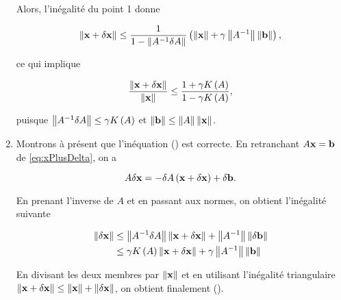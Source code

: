 \begin{enumerate}[label=\alph*)]
  Alors, l'inégalité du point 1 donne 
  
  \begin{equation*}
    \left\lVert\mathbf{x} + \delta \mathbf{x}\right\rVert
    \leq \dfrac{1}{1 - \left\lVert A^{-1} \delta A\right\rVert} \left(\left\lVert\mathbf{x}\right\rVert + \gamma \left\lVert A^{-1}\right\rVert \left\lVert\mathbf{b}\right\rVert\right),
  \end{equation*}
  
  ce qui implique
  
  \begin{equation*}
    \dfrac{\left\lVert\mathbf{x} + \delta \mathbf{x}\right\rVert}{\left\lVert\mathbf{x}\right\rVert}
    \leq \dfrac{1 + \gamma K \left(A\right)}{1 - \gamma K \left(A\right)},
  \end{equation*}
  
  puisque $\left\lVert A^{-1} \delta A\right\rVert \leq \gamma K \left(A\right)$ et $\left\lVert\mathbf{b}\right\rVert \leq \left\lVert A\right\rVert \left\lVert\mathbf{x}\right\rVert$.
  
  \item Montrons à présent que l'inéquation () est correcte.
  En retranchant $A \mathbf{x} = \mathbf{b}$ de \eqref{eq:xPlusDelta}, on a 
  
  \begin{equation*}
    A \delta \mathbf{x} = - \delta A \left(\mathbf{x} + \delta \mathbf{x}\right) + \delta \mathbf{b}.
  \end{equation*}
  
  En prenant l'inverse de $A$ et en passant aux normes, on obtient l'inégalité suivante 
  
  \begin{equation*}
    \begin{split}
      \left\lVert\delta \mathbf{x}\right\rVert
      & \leq \left\lVert A^{-1} \delta A\right\rVert \left\lVert\mathbf{x} + \delta \mathbf{x}\right\rVert + \left\lVert A^{-1}\right\rVert \left\lVert\delta \mathbf{b}\right\rVert \\
      & \leq \gamma K \left(A\right) \left\lVert\mathbf{x} + \delta \mathbf{x}\right\rVert + \gamma \left\lVert A^{-1}\right\rVert \left\lVert\mathbf{b}\right\rVert
    \end{split}
  \end{equation*}
  
  En divisant les deux membres par $\left\lVert\mathbf{x}\right\rVert$ et en utilisant l'inégalité triangulaire $\left\lVert\mathbf{x} + \delta \mathbf{x}\right\rVert \leq \left\lVert\mathbf{x}\right\rVert + \left\lVert\delta \mathbf{x}\right\rVert$, on obtient finalement ().
  
  
\end{enumerate}